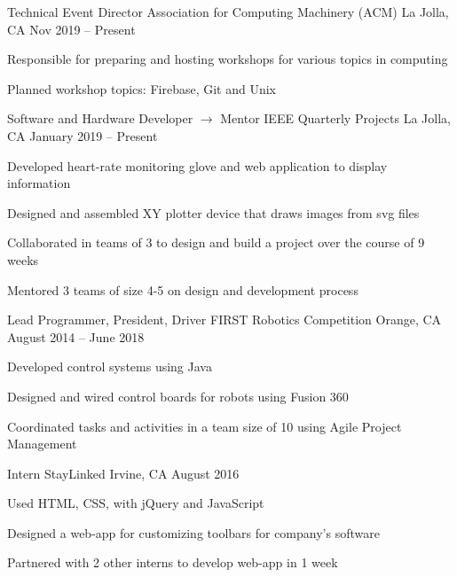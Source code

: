 \documentclass[]{awesome-cv}
\begin{document}
\vspace{-5mm}
\begin{cventries}
	\cventry
  {Technical Event Director}
  {Association for Computing Machinery (ACM)}
	{La Jolla, CA}
  {Nov 2019 – Present}
	{\begin{cvitems}
    \item {Responsible for preparing and hosting workshops for various topics in computing}
    \item {Planned workshop topics: Firebase, Git and Unix}
		\end{cvitems}}

	\vspace{-5mm}
	\cventry
  {Software and Hardware Developer $\longrightarrow$  Mentor}
	{IEEE Quarterly Projects}
	{La Jolla, CA}
  {January 2019 – Present}
	{\begin{cvitems}
		\item {Developed heart-rate monitoring glove and web application to display information}
    \item {Designed and assembled XY plotter device that draws images from svg files}
    \item {Collaborated in teams of 3 to design and build a project over the course of 9 weeks}
    \item {Mentored 3 teams of size 4-5 on design and development process}
		\end{cvitems}}

	\vspace{-5mm}
	\cventry
	{Lead Programmer, President, Driver}
	{FIRST Robotics Competition}
	{Orange, CA}
	{August 2014 – June 2018}
	{\begin{cvitems}
		\item {Developed control systems using Java}
		\item {Designed and wired control boards for robots using Fusion 360}
		\item {Coordinated tasks and activities in a team size of 10 using Agile Project Management}
		\end{cvitems}}

	\vspace{-5mm}
	\cventry
	{Intern}
	{StayLinked}
	{Irvine, CA}
	{August 2016}
	{\begin{cvitems}
		\item {Used HTML, CSS, with jQuery and JavaScript}
		\item {Designed a web-app for customizing toolbars for company’s software}
    \item {Partnered with 2 other interns to develop web-app in 1 week}
		\end{cvitems}}

\end{cventries}
\end{document}
